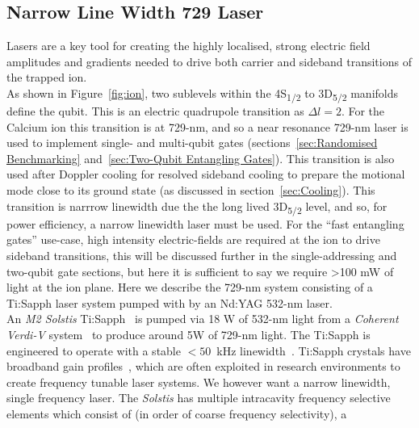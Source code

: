     
\subsection{Narrow Line Width 729 Laser}
\label{sec:Narrow Line Width 729 Laser} 

    Lasers are a key tool for creating the highly localised, strong electric
    field amplitudes and gradients needed to drive both carrier and sideband
    transitions of the trapped ion.\\ As shown in Figure~\ref{fig:ion}, 
    two sublevels within the 4S\textsubscript{1/2} to 3D\textsubscript{5/2}
    manifolds define the qubit. This is an electric quadrupole transition as
    $\Delta l = 2$.  For the Calcium ion this transition is at 729-nm, and so 
    a near resonance 729-nm laser is used to implement single- and multi-qubit gates
    (sections~\ref{sec:Randomised Benchmarking} and~\ref{sec:Two-Qubit
    Entangling Gates}). This transition is also used after Doppler cooling for
    resolved sideband cooling to prepare the motional mode close to its ground
    state (as discussed in section~\ref{sec:Cooling}).
    This transition is narrrow linewidth due the the long lived
    3D\textsubscript{5/2} level, and so, for power efficiency, a
    narrow linewidth laser must be used. For the ``fast entangling gates'' use-case, high intensity electric-fields are required at the ion to drive sideband
    transitions, this will be discussed further in the single-addressing and
    two-qubit gate sections, but here it is sufficient to say we require >100 mW
    of light at the ion plane.  Here we describe the 729-nm system 
    consisting of a Ti:Sapph laser system pumped with by an Nd:YAG 532-nm laser.\\
    An \emph{M2 Solstis} Ti:Sapph~\cite{} is pumped via 18 W of 532-nm light
    from a \emph{Coherent Verdi-V} system~\cite{} to produce around 5W of
    729-nm light.  The Ti:Sapph is engineered to operate with a stable $<50$~kHz
    linewidth~\cite{}. Ti:Sapph crystals have broadband gain profiles~\cite{}, which
    are often exploited in research environments to create frequency tunable
    laser systems. We however want a narrow linewidth, single frequency laser.
    The \emph{Solstis} has multiple intracavity frequency selective
    elements which consist of (in order of coarse frequency selectivity), a
